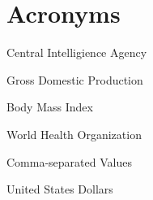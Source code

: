 \documentclass[oneside,12pt]{report}
\begin{document}
\chapter{Acronyms}\label{Acronyms}

 Central Intelligience Agency
\vspace{5pt}

 Gross Domestic Production

\vspace{5pt}

 Body Mass Index

\vspace{5pt}

 World Health Organization

\vspace{5pt}

 Comma-separated Values

\vspace{5pt}

 United States Dollars




\renewcommand\bibname{Selected Bibliography Including Cited Works}
\nocite{*}  %

\end{document}
